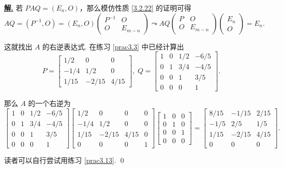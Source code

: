 \documentclass[10pt,openany]{article}
\theoremstyle{thmstyle} %
\theoremstyle{defstyle} %
\theoremstyle{prostyle} %
\theoremstyle{exastyle}
\theoremstyle{remstyle}
\newenvironment{solution}{\par\underline{\textbf{解.}} \;\fangsong}{\qed\par}
\begin{document}
\begin{solution}
	若 \( PAQ=(E_n,O) \)，那么模仿性质 \ref{3.2.22} 的证明可得
	\[ AQ=(P^{-1},O)=(E_n,O)\begin{pmatrix}
		P^{-1} & O \\
		O & E_{m-n}
	\end{pmatrix} \leadsto AQ\begin{pmatrix}
	P & O \\
	O & E_{m-n}
	\end{pmatrix}\begin{pmatrix}
	E_n  \\
	O 
	\end{pmatrix}=E_n. \]
	
	这就找出 \( A \) 的右逆表达式. 在练习 \ref{prac3.3} 中已经计算出
	\[ P=\begin{bmatrix}
		1/2 & 0 & 0 \\
		-1/4 & 1/2 & 0 \\
		1/15 & -2/15 & 4/15
	\end{bmatrix}, \; Q=\begin{bmatrix}
	1 & 0 & 1/2 & -6/5 \\
	0 & 1 & 3/4 & -4/5 \\
	0 & 0 & 1 & 3/5 \\
	0 & 0 & 0 & 1
	\end{bmatrix}. \]
	
	
	那么 \( A \) 的一个右逆为
	\[ \begin{bmatrix}
		1 & 0 & 1/2 & -6/5 \\
		0 & 1 & 3/4 & -4/5 \\
		0 & 0 & 1 & 3/5 \\
		0 & 0 & 0 & 1
	\end{bmatrix}\begin{bmatrix}
	1/2 & 0 & 0 & 0 \\
	-1/4 & 1/2 & 0 & 0 \\
	1/15 & -2/15 & 4/15 & 0 \\
	0 & 0 & 0 & 1
	\end{bmatrix}\begin{bmatrix}
	1 & 0 & 0 \\
	0 & 1 & 0 \\
    0 & 0 & 1 \\
	0 & 0 & 0
	\end{bmatrix}=\begin{bmatrix}
	8/15 & -1/15 & 2/15 \\
	-1/5 &  2/5  & 1/5 \\
	1/15 & -2/15 & 4/15 \\
	0    &  0    & 0
	\end{bmatrix}. \]
	
	读者可以自行尝试用练习 \ref{prac3.13}.
\end{solution}
\end{document}
